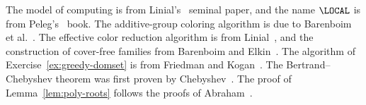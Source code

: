 The model of computing is from Linial's~\cite{linial92locality} seminal paper, and the name $\LOCAL$ is from Peleg's~\cite{peleg00distributed} book. The additive-group coloring algorithm is due to Barenboim et al.\ \cite{barenboim18iterative}. The effective color reduction algorithm is from Linial~\cite{linial92locality}, and the construction of cover-free families from Barenboim and Elkin~\cite{barenboim13distributed}.
The algorithm of Exercise~\ref{ex:greedy-domset} is from Friedman and Kogan~\cite{friedman11deterministic}. The Bertrand--Chebyshev theorem was first proven by Chebyshev~\cite{chebyshev1852primes}. The proof of Lemma~\ref{lem:poly-roots} follows the proofs of Abraham~\cite{abraham2020polynomials}.

